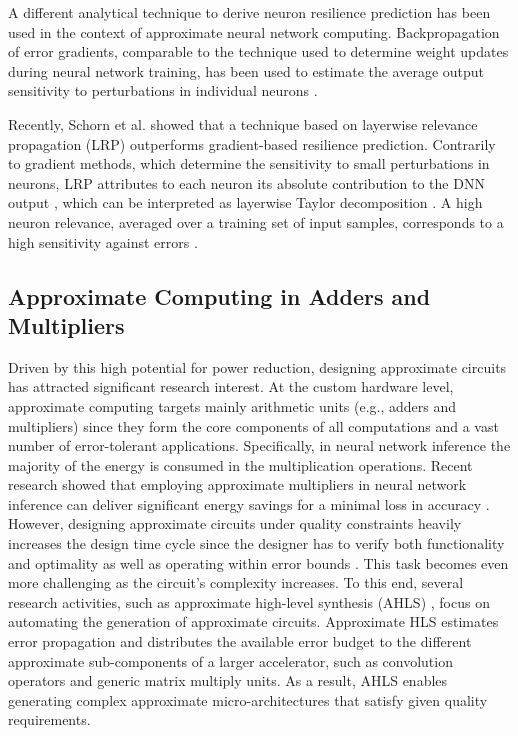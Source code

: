 A different analytical technique to derive neuron resilience prediction has been used in the context of approximate neural network computing. Backpropagation of error gradients, comparable to the technique used to determine weight updates during neural network training, has been used to estimate the average output sensitivity to perturbations in individual neurons \cite{venkataramani2014axnn, zhang2015approxann}.

Recently, Schorn et al. \cite{li2018smartshuttle} showed that a technique based on layerwise relevance propagation (LRP) \cite{bach2015pixel} outperforms gradient-based resilience prediction. Contrarily to gradient methods, which determine the sensitivity to small perturbations in neurons, LRP attributes to each neuron its absolute contribution to the DNN output \cite{montavon2018methods}, which can be interpreted as layerwise Taylor decomposition \cite{montavon2017explaining}. A high neuron relevance, averaged over a training set of input samples, corresponds to a high sensitivity against errors \cite{li2018smartshuttle}.

\subsection{Approximate Computing in Adders and Multipliers}
Driven by this high potential for power reduction, designing approximate circuits has attracted significant research interest. At the custom hardware level, approximate computing targets mainly arithmetic units \cite{miao2012modeling, shafique2015low, zervakis2019vader, saadat2018minimally} (e.g., adders and multipliers) since they form the core components of all computations and a vast number of error-tolerant applications. Specifically, in neural network inference the majority of the energy is consumed in the multiplication operations. Recent research showed that employing approximate multipliers in neural network inference can deliver significant energy savings for a minimal loss in accuracy \cite{saadat2018minimally, sarwar2018energy, tasoulas2020weight}. However, designing approximate circuits under quality constraints heavily increases the design time cycle since the designer has to verify both functionality and optimality as well as operating within error bounds \cite{zervakis2018multi}. This task becomes even more challenging as the circuit’s complexity increases. To this end, several research activities, such as approximate high-level synthesis (AHLS) \cite{lee2017high}, focus on automating the generation of approximate circuits. Approximate HLS estimates error propagation and distributes the available error budget to the different approximate sub-components of a larger accelerator, such as convolution operators and generic matrix multiply units. As a result, AHLS enables generating complex approximate micro-architectures that satisfy given quality requirements.

